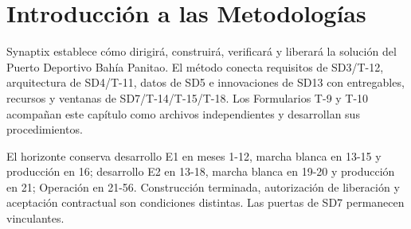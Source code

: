 \chapter{Introducción a las Metodologías}
Synaptix establece cómo dirigirá, construirá, verificará y liberará la solución del Puerto Deportivo Bahía Panitao. El método conecta requisitos de SD3/T-12, arquitectura de SD4/T-11, datos de SD5 e innovaciones de SD13 con entregables, recursos y ventanas de SD7/T-14/T-15/T-18. Los Formularios T-9 y T-10 acompañan este capítulo como archivos independientes y desarrollan sus procedimientos. \parencite[Formulario T-7, Subdocumento 6, p.~58; T-9/T-10, p.~61]{sd6-ba}

El horizonte conserva desarrollo E1 en meses 1-12, marcha blanca en 13-15 y producción en 16; desarrollo E2 en 13-18, marcha blanca en 19-20 y producción en 21; Operación en 21-56. Construcción terminada, autorización de liberación y aceptación contractual son condiciones distintas. Las puertas de SD7 permanecen vinculantes. \parencite[art.~17, pp.~12-13]{sd6-ba}



